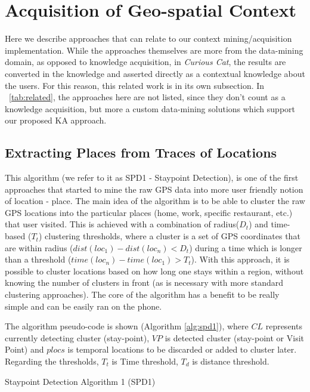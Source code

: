 \section{Acquisition of Geo-spatial Context}
Here we describe approaches that can relate to our 
context mining/acquisition implementation. While the approaches themselves are
more from the data-mining domain, as opposed to knowledge acquisition, in
\emph{Curious Cat}, the results are converted in the knowledge and asserted 
directly as a contextual knowledge about the users. For this reason, this
related work is in its own subsection. In \tablename~\ref{tab:related}, the 
approaches here are not listed, since they don't count as a knowledge
acquisition, but more a custom data-mining solutions which support our
proposed KA approach.

\subsection{Extracting Places from Traces of Locations}
\label{section:SPD1}
This algorithm (we refer to it as SPD1 - Staypoint Detection), is one of the 
first approaches that started to mine the raw GPS data
into more user friendly notion of location - place.\parencite{Kang2005} The main
idea of the algorithm is to be able to cluster the raw GPS locations into the
particular places (home, work, specific restaurant, etc.) that user visited. 
This is achieved with a combination of radius($D_t$) and time-based ($T_t$) 
clustering thresholds, where a cluster is a set of GPS coordinates that are 
within radius ($dist(loc_1) - dist(loc_n) < D_t$) during a time which is longer 
than a threshold ($time(loc_n)-time(loc_1) > T_t$). With this approach, it is
possible to cluster locations based on how long one stays within a region, 
without knowing the number of clusters in front (as is necessary with more
standard clustering approaches). The core of the algorithm has a benefit
to be really simple and can be easily ran on the phone.

The algorithm pseudo-code is shown (Algorithm \ref{alg:spd1}), where $CL$ 
represents currently 
detecting cluster (stay-point), $VP$ is detected cluster (stay-point or Visit 
Point) and $plocs$ is temporal locations to be discarded or added to cluster
later. Regarding the thresholds, $T_t$ is Time threshold, $T_d$ is distance 
threshold.

\begin{algorithm}[htb]
\caption{Staypoint Detection Algorithm 1 (SPD1)}
\label{alg:spd1}

\vspace{5pt}
\vspace{5pt}
{
}
\end{algorithm}

